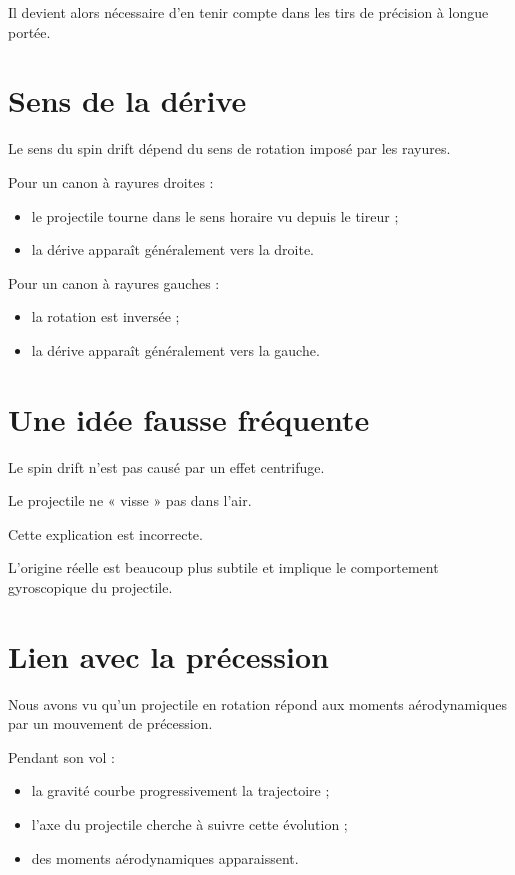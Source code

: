 Il devient alors nécessaire d'en tenir compte dans les tirs de précision à
longue portée.

\section{Sens de la dérive}

Le sens du spin drift dépend du sens de rotation imposé par les rayures.

Pour un canon à rayures droites :

\begin{itemize}
    \item le projectile tourne dans le sens horaire vu depuis le tireur ;
    \item la dérive apparaît généralement vers la droite.
\end{itemize}

Pour un canon à rayures gauches :

\begin{itemize}
    \item la rotation est inversée ;
    \item la dérive apparaît généralement vers la gauche.
\end{itemize}

\section{Une idée fausse fréquente}

Le spin drift n'est pas causé par un effet centrifuge.

Le projectile ne « visse » pas dans l'air.

Cette explication est incorrecte.

L'origine réelle est beaucoup plus subtile et implique le comportement
gyroscopique du projectile.

\section{Lien avec la précession}

Nous avons vu qu'un projectile en rotation répond aux moments aérodynamiques
par un mouvement de précession.

Pendant son vol :

\begin{itemize}
    \item la gravité courbe progressivement la trajectoire ;
    \item l'axe du projectile cherche à suivre cette évolution ;
    \item des moments aérodynamiques apparaissent.
\end{itemize}

